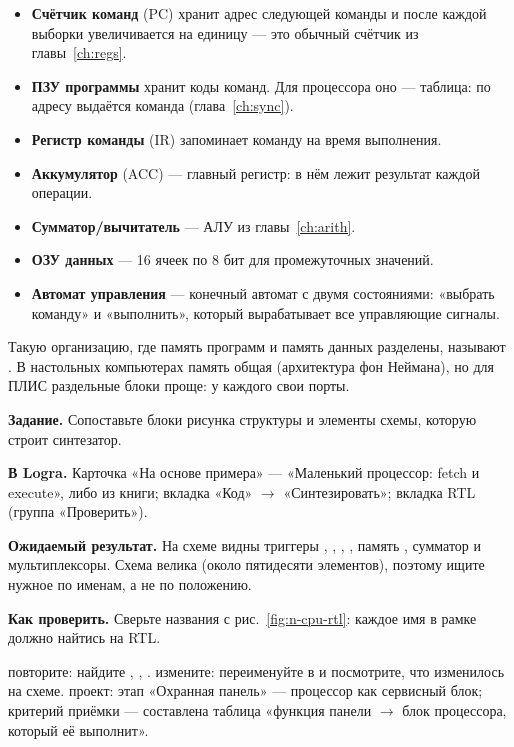 \begin{itemize}
  \item \textbf{Счётчик команд} (PC) хранит адрес следующей команды и после каждой
        выборки увеличивается на единицу --- это обычный счётчик из
        главы~\ref{ch:regs}.
  \item \textbf{ПЗУ программы} хранит коды команд. Для процессора оно --- таблица:
        по адресу выдаётся команда (глава~\ref{ch:sync}).
  \item \textbf{Регистр команды} (IR) запоминает команду на время выполнения.
  \item \textbf{Аккумулятор} (ACC) --- главный регистр: в нём лежит результат
        каждой операции.
  \item \textbf{Сумматор/вычитатель} --- АЛУ из главы~\ref{ch:arith}.
  \item \textbf{ОЗУ данных} --- 16 ячеек по 8 бит для промежуточных значений.
  \item \textbf{Автомат управления} --- конечный автомат с двумя состояниями:
        «выбрать команду» и «выполнить», который вырабатывает все управляющие
        сигналы.
\end{itemize}

Такую организацию, где память программ и память данных разделены, называют
. В настольных компьютерах память общая (архитектура фон
Неймана), но для ПЛИС раздельные блоки проще: у каждого свои порты.

\begin{diybox}
\textbf{Задание.} Сопоставьте блоки рисунка структуры и элементы схемы, которую строит синтезатор.

\textbf{В Logra.} Карточка «На основе примера» --- «Маленький процессор: fetch и execute», либо  из книги; вкладка «Код» $\to$ «Синтезировать»; вкладка RTL (группа «Проверить»).

\textbf{Ожидаемый результат.} На схеме видны триггеры , , , , память , сумматор и мультиплексоры. Схема велика (около пятидесяти элементов), поэтому ищите нужное по именам, а не по положению.

\textbf{Как проверить.} Сверьте названия с рис.~\ref{fig:n-cpu-rtl}: каждое имя в рамке должно найтись на RTL.

 повторите: найдите , , .  измените: переименуйте  в  и посмотрите, что изменилось на схеме.  проект: этап «Охранная панель» --- процессор как сервисный блок; критерий приёмки --- составлена таблица «функция панели $\to$ блок процессора, который её выполнит».
\end{diybox}

